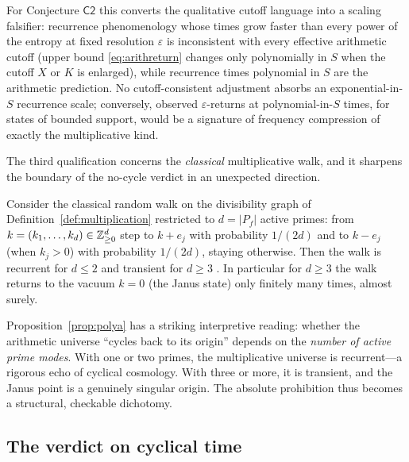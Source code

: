 For Conjecture $\mathsf{C2}$ this converts the qualitative cutoff language into a scaling
falsifier: recurrence phenomenology whose times grow faster than every power of the entropy
at fixed resolution $\varepsilon$ is inconsistent with every effective arithmetic cutoff
(upper bound \eqref{eq:arithreturn} changes only polynomially in $S$ when the cutoff $X$ or
$K$ is enlarged), while recurrence times polynomial in $S$ are the arithmetic prediction.
No cutoff-consistent adjustment absorbs an exponential-in-$S$ recurrence scale; conversely,
observed $\varepsilon$-returns at polynomial-in-$S$ times, for states of bounded support,
would be a signature of frequency compression of exactly the multiplicative kind.

The third qualification concerns the \emph{classical} multiplicative walk, and it sharpens
the boundary of the no-cycle verdict in an unexpected direction.

\begin{proposition}\label{prop:polya}
Consider the classical random walk on the divisibility graph of
Definition~\ref{def:multiplication} restricted to $d=|P_{f}|$ active primes: from
$k=(k_{1},\dots,k_{d})\in\mathbb{Z}_{\geq0}^{d}$ step to $k+e_{j}$ with probability $1/(2d)$ and to
$k-e_{j}$ (when $k_{j}>0$) with probability $1/(2d)$, staying otherwise. Then the walk is
recurrent for $d\leq2$ and transient for $d\geq3$ \cite{polya1921}. In particular for
$d\geq3$ the walk returns to the vacuum $k=0$ (the Janus state) only finitely many times,
almost surely.
\end{proposition}

Proposition~\ref{prop:polya} has a striking interpretive reading: whether
the arithmetic universe ``cycles back to its origin'' depends on the \emph{number of active
prime modes}. With one or two primes, the multiplicative universe is recurrent---a rigorous
echo of cyclical cosmology. With three or more, it is transient, and the Janus point is a
genuinely singular origin. The absolute prohibition thus becomes a structural,
checkable dichotomy.

\subsection{The verdict on cyclical time}


